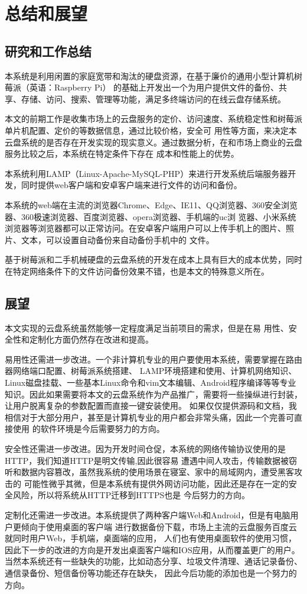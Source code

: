 \section{总结和展望}
\subsection{研究和工作总结}
本系统是利用闲置的家庭宽带和淘汰的硬盘资源，在基于廉价的通用小型计算机树莓派（英语：Raspberry Pi）
的基础上开发出一个为用户提供文件的备份、共享、存储、访问、搜索、管理等功能，满足多终端访问的在线云盘存储系统。

本文的前期工作是收集市场上的云盘服务的定价、访问速度、系统稳定性和树莓派单片机配置、定价的等数据信息，通过比较价格，安全可
用性等方面，来决定本云盘系统的是否存在开发实现的现实意义。通过数据分析，在和市场上商业的云盘服务比较之后，本系统在特定条件下存在
成本和性能上的优势。

本系统利用LAMP（Linux-Apache-MySQL-PHP）来进行开发系统后端服务器开发，同时提供web客户端和安卓客户端来进行文件的访问和备份。

本系统的web端在主流的浏览器Chrome、Edge、IE11、QQ浏览器、360安全浏览器、360极速浏览器、百度浏览器、opera浏览器、手机端的uc浏
览器、小米系统浏览器等浏览器都可以正常访问。在安卓客户端用户可以上传手机上的图片、照片、文本，可以设置自动备份来自动备份手机中的
文件。

基于树莓派和二手机械硬盘的云盘系统的开发在成本上具有巨大的成本优势，同时在特定网络条件下的文件访问备份效果不错，也是本文的特殊意义所在。
\subsection{展望}
本文实现的云盘系统虽然能够一定程度满足当前项目的需求，但是在易
用性、安全性和定制化方面仍然存在改进和提高。

易用性还需进一步改进。一个非计算机专业的用户要使用本系统，需要掌握在路由器网络端口配置、树莓派系统搭建、
LAMP环境搭建和使用、计算机网络知识、Linux磁盘挂载、一些基本Linux命令和vim文本编辑、Android程序编译等等专业
知识。因此如果需要将本文的云盘系统作为产品推广，需要将一些操纵进行封装，让用户脱离复杂的参数配置而直接一键安装使用。
如果仅仅提供源码和文档，我相信对于大部分用户，甚至是计算机专业的用户都会非常头痛，因此一个完善可直接使用
的软件环境是今后需要努力的方向。

安全性还需进一步改进。因为开发时间仓促，本系统的网络传输协议使用的是HTTP，我们知道HTTP是明文传输,因此很容易
遭遇中间人攻击，传输数据被窃听和数据内容篡改，虽然我系统的使用场景在寝室、家中的局域网内，遭受黑客攻击的
可能性微乎其微，但是本系统有提供外网访问功能，因此还是存在一定的安全风险，所以将系统从HTTP迁移到HTTPS也是
今后努力的方向。

定制化还需进一步改进。本系统提供了两种客户端Web和Android，但是有电脑用户更倾向于使用桌面的客户端
进行数据备份下载，市场上主流的云盘服务百度云就同时用户Web，手机端，桌面端的应用，
人们也有使用桌面软件的使用习惯，因此下一步的改进的方向是开发出桌面客户端和IOS应用，从而覆盖更广的用户。
当然本系统还有一些缺失的功能，比如动态分享、垃圾文件清理、通话记录备份、通信录备份、短信备份等功能还存在缺失，
因此今后功能的添加也是一个努力的方向。

